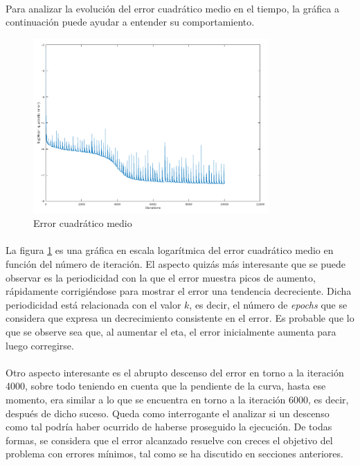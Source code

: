 \documentclass[12pt, twocolumn]{article}
\begin{document}
	\paragraph{} Para analizar la evolución del error cuadrático medio en el tiempo, la gráfica a continuación puede ayudar a entender su comportamiento. 
	
	\begin{figure}[H]
		\centering
		\includegraphics[width=9cm]{../results/adaptive_eta_incremental/3/log_incremental.png}
		\caption{Error cuadrático medio}
		\label{error1}
	\end{figure}
	
	\paragraph{} La figura \ref{error1} es una gráfica en escala logarítmica del error cuadrático medio en función del número de iteración. El aspecto quizás más interesante que se puede observar es la periodicidad con la que el error muestra picos de aumento, rápidamente corrigiéndose para mostrar el error una tendencia decreciente. Dicha periodicidad está relacionada con el valor $k$, es decir, el número de \textit{epochs} que se considera que expresa un decrecimiento consistente en el error. Es probable que lo que se observe sea que, al aumentar el eta, el error inicialmente aumenta para luego corregirse.
	
	\paragraph{} Otro aspecto interesante es el abrupto descenso del error en torno a la iteración 4000, sobre todo teniendo en cuenta que la pendiente de la curva, hasta ese momento, era similar a lo que se encuentra en torno a la iteración 6000, es decir, después de dicho suceso. Queda como interrogante el analizar si un descenso como tal podría haber ocurrido de haberse proseguido la ejecución. De todas formas, se considera que el error alcanzado resuelve con creces el objetivo del problema con errores mínimos, tal como se ha discutido en secciones anteriores. 
\end{document}
